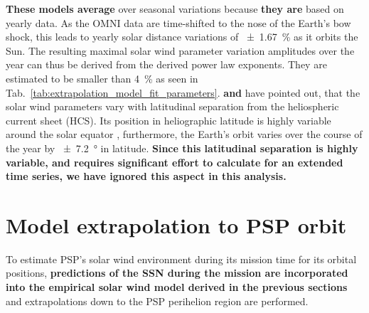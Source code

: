 \textbf{These models average} over seasonal variations because \textbf{they are} based on yearly data. As the OMNI data are time-shifted to the nose of the Earth’s bow shock, this leads to yearly solar distance variations of \SI{+-1.67}{\%} as it orbits the Sun. The resulting maximal solar wind parameter variation amplitudes over the year can thus be derived from the derived power law exponents. They are estimated to be smaller than \SI{4}{\percent} as seen in Tab.~\ref{tab:extrapolation_model_fit_parameters}. \citet{Bruno1986} \textbf{and} \citet{Balogh1999} have pointed out, that the solar wind parameters vary with latitudinal separation from the heliospheric current sheet (HCS). Its position in heliographic latitude is highly variable around the solar equator \citep{Schwenn1990}, furthermore, the Earth’s orbit varies over the course of the year by \SI{+-7.2}{\degree} in latitude. \textbf{Since this latitudinal separation is highly variable, and requires significant effort to calculate for an extended time series, we have ignored this aspect in this analysis.}	%


\section{Model extrapolation to PSP orbit}
\label{sec:model_extrapolation_to_psp_orbit}
To estimate PSP’s solar wind environment during its mission time for its orbital positions, \textbf{predictions of the SSN during the mission are incorporated into the empirical solar wind model derived in the previous sections} and extrapolations down to the PSP perihelion region are performed.

